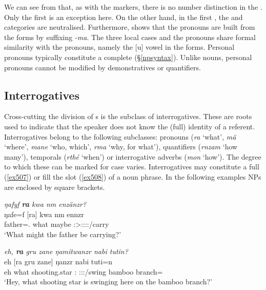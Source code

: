 We can see from  that, as with the  markers, there is no number distinction in the . Only the first  is an exception here. On the other hand, in the first  , the  and  categories are neutralised. Furthermore,  shows that the  pronouns are built from the  forms by suffixing \emph{-ma}. The three local cases and the  pronouns share formal similarity with the  pronouns, namely the [u] vowel in the  forms. Personal pronouns typically constitute a complete  ({\S}\ref{npsyntax}). Unlike nouns, personal pronouns cannot be modified by demonstratives or quantifiers.

\newpage	
\subsection{Interrogatives} \label{interrogatives-sec}

Cross-cutting the division of s is the subclass of interrogatives. These are roots used to indicate that the speaker does not know the (full) identity of a referent. Interrogatives belong to the following  subclasses: pronouns (\emph{ra} `what', \emph{mä} `where', \emph{mane} `who, which', \emph{rma} `why, for what'), quantifiers (\emph{rnzam} `how many'), temporals (\emph{rthé} `when') or interrogative adverbs (\emph{mon} `how'). The degree to which these can be marked for case varies. Interrogatives may constitute a full  (\ref{ex507}) or fill the  slot (\ref{ex508}) of a noun phrase. In the following examples NPs are enclosed by square brackets.

\begin{exe}
	\ex \emph{ŋafyf \textbf{ra} kwa nm enzänzr?}\\
	\gll ŋafe=f [ra] kwa nm ennzr\\
	father=\Erg.{\Sg} what {\Fut} maybe \Stsg:\Sbj>\Stpl:\Obj:\Nonpast:\Ipfv:\Venit/carry\\
	\trans `What might the father be carrying?' 
	\label{ex507}
\end{exe}
\begin{exe}
	\ex \emph{eh, \textbf{ra} gru zane ŋamitwanzr nabi tutin?}\\
	\gll eh [ra gru zane] ŋanzr nabi tuti=n\\
	eh what shooting.star \Dem:{\Prox} \Stsg:\Sbj:\Nonpast:\Ipfv/swing bamboo branch={\Loc}\\
	\trans `Hey, what shooting star is swinging here on the bamboo branch?'\\ 
	\label{ex508}
\end{exe}%

